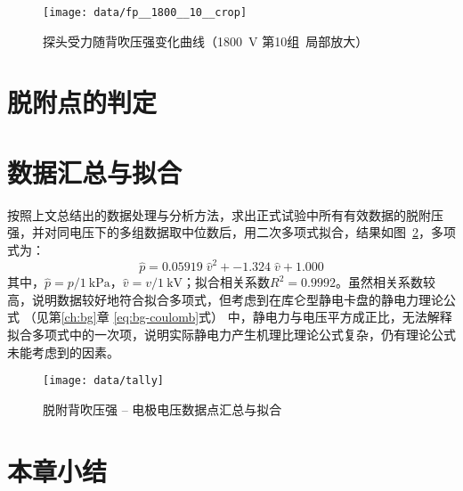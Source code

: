 \begin{figure}[thbp]
\centering
\texttt{[image: data/fp\_\_1800\_\_10\_\_crop]}
\caption{探头受力随背吹压强变化曲线（\SI{1800}{\V} 第10组\ 局部放大）}
\label{fig:data-fp-1800-10-crop}
\end{figure}








\section{脱附点的判定}\label{sec:analysis-criterion}





\section{数据汇总与拟合}\label{sec:analysis-tally}

按照上文总结出的数据处理与分析方法，求出正式试验中所有有效数据的脱附压强，并对同电压下的多组数据取中位数\footnotemark{}后，用二次多项式拟合，结果如图~\ref{fig:data-tally}，多项式为：
\[
\hat{p} = 0.05919\;\hat{v}^2 + -1.324\;\hat{v} + 1.000
\]
其中，$\hat{p} = p / \SI{1}{\kPa}$，$\hat{v} = v / \SI{1}{\kV}$；拟合相关系数$R^2 = \num{0.9992}$。虽然相关系数较高，说明数据较好地符合拟合多项式，但考虑到在库仑型静电卡盘的静电力理论公式%
（见第\ref{ch:bg}章 \eqref{eq:bg-coulomb}式）%
中，静电力与电压平方成正比，无法解释拟合多项式中的一次项，说明实际静电力产生机理比理论公式复杂，仍有理论公式未能考虑到的因素。


\begin{figure}[thbp]
\centering
\texttt{[image: data/tally]}
\caption{脱附背吹压强 -- 电极电压数据点汇总与拟合}
\label{fig:data-tally}
\end{figure}



\section{本章小结}\label{sec:analysis-summary}


